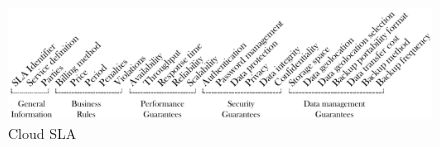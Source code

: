 \begin{figure}[h!]
\center
\includegraphics[scale=0.57]{Cloud_SLA.pdf}
\caption{Cloud SLA}\label{fig:cloudsla}
\end{figure}